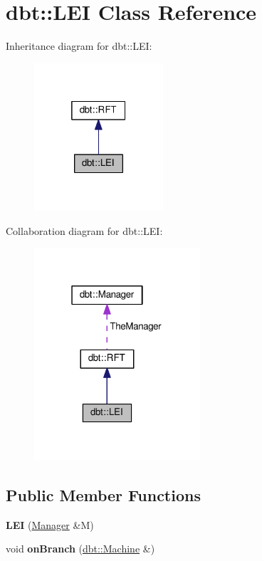 \hypertarget{classdbt_1_1_l_e_i}{}\section{dbt\+:\+:L\+EI Class Reference}
\label{classdbt_1_1_l_e_i}


Inheritance diagram for dbt\+:\+:L\+EI\+:\nopagebreak
\begin{figure}[H]
\begin{center}
\leavevmode
\includegraphics[width=136pt]{classdbt_1_1_l_e_i__inherit__graph}
\end{center}
\end{figure}


Collaboration diagram for dbt\+:\+:L\+EI\+:\nopagebreak
\begin{figure}[H]
\begin{center}
\leavevmode
\includegraphics[width=175pt]{classdbt_1_1_l_e_i__coll__graph}
\end{center}
\end{figure}
\subsection*{Public Member Functions}
\begin{DoxyCompactItemize}
\item 
{\bfseries L\+EI} (\hyperlink{classdbt_1_1_manager}{Manager} \&M)\hypertarget{classdbt_1_1_l_e_i_ada2b89410703c4238b70404f340e25da}{}\label{classdbt_1_1_l_e_i_ada2b89410703c4238b70404f340e25da}

\item 
void {\bfseries on\+Branch} (\hyperlink{classdbt_1_1_machine}{dbt\+::\+Machine} \&)\hypertarget{classdbt_1_1_l_e_i_a976b41294fbedcb1672c88ede50cd46e}{}\label{classdbt_1_1_l_e_i_a976b41294fbedcb1672c88ede50cd46e}

\end{DoxyCompactItemize}
